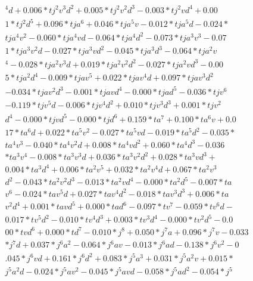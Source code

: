 \begin{align}
  ^4 d + 0.006 * t j^2 v^3 d^2 + 0.005 * t j^2 v^2 d^3 -0.003 * t j^2 v d^4 + 0.00 \\
  1 * t j^2 d^5 + 0.096 * t j a^6 + 0.046 * t j a^5 v -0.012 * t j a^5 d -0.024 *  \\
  t j a^4 v^2 -0.060 * t j a^4 v d -0.064 * t j a^4 d^2 -0.073 * t j a^3 v^3 -0.07 \\
  1 * t j a^3 v^2 d -0.027 * t j a^3 v d^2 -0.045 * t j a^3 d^3 -0.064 * t j a^2 v \\
  ^4 -0.028 * t j a^2 v^3 d + 0.019 * t j a^2 v^2 d^2 -0.027 * t j a^2 v d^3 -0.00 \\
  5 * t j a^2 d^4 -0.009 * t j a v^5 + 0.022 * t j a v^4 d + 0.097 * t j a v^3 d^2 \\
   -0.034 * t j a v^2 d^3 -0.001 * t j a v d^4 -0.000 * t j a d^5 -0.036 * t j v^6 \\
   -0.119 * t j v^5 d -0.006 * t j v^4 d^2 + 0.010 * t j v^3 d^3 + 0.001 * t j v^2 \\
   d^4 -0.000 * t j v d^5 -0.000 * t j d^6 + 0.159 * t a^7 + 0.100 * t a^6 v + 0.0 \\
  17 * t a^6 d + 0.022 * t a^5 v^2 -0.027 * t a^5 v d -0.019 * t a^5 d^2 -0.035 *  \\
  t a^4 v^3 -0.040 * t a^4 v^2 d + 0.008 * t a^4 v d^2 + 0.060 * t a^4 d^3 -0.036  \\
  * t a^3 v^4 -0.008 * t a^3 v^3 d + 0.036 * t a^3 v^2 d^2 + 0.028 * t a^3 v d^3 + \\
   0.004 * t a^3 d^4 + 0.006 * t a^2 v^5 + 0.032 * t a^2 v^4 d + 0.067 * t a^2 v^3 \\
   d^2 -0.043 * t a^2 v^2 d^3 -0.013 * t a^2 v d^4 -0.000 * t a^2 d^5 -0.007 * t a \\
   v^6 -0.024 * t a v^5 d + 0.027 * t a v^4 d^2 -0.018 * t a v^3 d^3 + 0.006 * t a \\
   v^2 d^4 + 0.001 * t a v d^5 + 0.000 * t a d^6 -0.097 * t v^7 -0.059 * t v^6 d - \\
  0.017 * t v^5 d^2 -0.010 * t v^4 d^3 + 0.003 * t v^3 d^4 -0.000 * t v^2 d^5 -0.0 \\
  00 * t v d^6 + 0.000 * t d^7 -0.010 * j^8 + 0.050 * j^7 a + 0.096 * j^7 v -0.033 \\
   * j^7 d + 0.037 * j^6 a^2 -0.064 * j^6 a v -0.013 * j^6 a d -0.138 * j^6 v^2 -0 \\
  .045 * j^6 v d + 0.161 * j^6 d^2 + 0.083 * j^5 a^3 + 0.031 * j^5 a^2 v + 0.015 * \\
   j^5 a^2 d -0.024 * j^5 a v^2 -0.045 * j^5 a v d -0.058 * j^5 a d^2 -0.054 * j^5 \\

\end{align}
